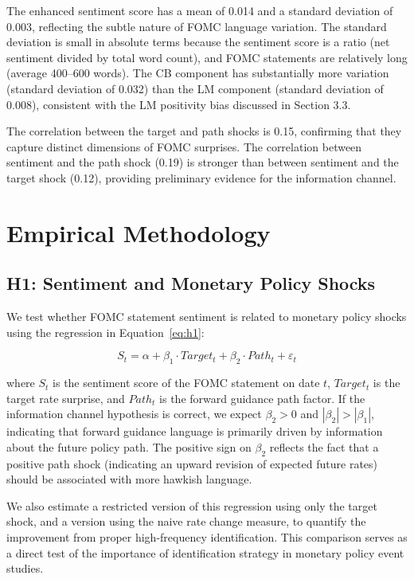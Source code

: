 \documentclass[12pt]{article}
\begin{document}
The enhanced sentiment score has a mean of 0.014 and a standard deviation of 0.003, reflecting the subtle nature of FOMC language variation. The standard deviation is small in absolute terms because the sentiment score is a ratio (net sentiment divided by total word count), and FOMC statements are relatively long (average 400--600 words). The CB component has substantially more variation (standard deviation of 0.032) than the LM component (standard deviation of 0.008), consistent with the LM positivity bias discussed in Section 3.3.

The correlation between the target and path shocks is 0.15, confirming that they capture distinct dimensions of FOMC surprises. The correlation between sentiment and the path shock (0.19) is stronger than between sentiment and the target shock (0.12), providing preliminary evidence for the information channel.


\section{Empirical Methodology}

\subsection{H1: Sentiment and Monetary Policy Shocks}

We test whether FOMC statement sentiment is related to monetary policy shocks using the regression in Equation~\eqref{eq:h1}:

\begin{equation}
\label{eq:h1}
S_t = \alpha + \beta_1 \cdot Target_t + \beta_2 \cdot Path_t + \varepsilon_t
\end{equation}

where $S_t$ is the sentiment score of the FOMC statement on date $t$, $Target_t$ is the target rate surprise, and $Path_t$ is the forward guidance path factor. If the information channel hypothesis is correct, we expect $\beta_2 > 0$ and $|\beta_2| > |\beta_1|$, indicating that forward guidance language is primarily driven by information about the future policy path. The positive sign on $\beta_2$ reflects the fact that a positive path shock (indicating an upward revision of expected future rates) should be associated with more hawkish language.

We also estimate a restricted version of this regression using only the target shock, and a version using the naive rate change measure, to quantify the improvement from proper high-frequency identification. This comparison serves as a direct test of the importance of identification strategy in monetary policy event studies.
\end{document}
